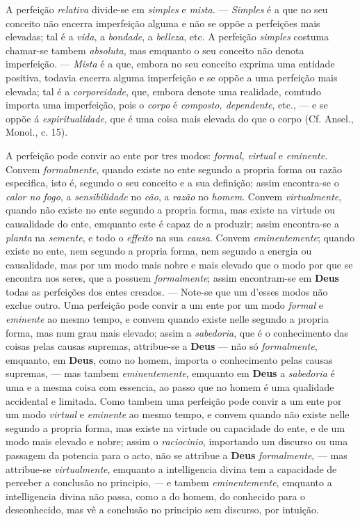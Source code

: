 {A perfeição \emph{relativa} divide-se em \emph{simples} e \emph{mista}. ---
\emph{Simples} é a que no seu conceito não encerra imperfeição alguma e não se oppõe a
perfeições mais elevadas; tal é a \emph{vida}, a \emph{bondade}, a \emph{belleza}, etc. A
perfeição \emph{simples} costuma chamar-se tambem \emph{absoluta}, mas emquanto o seu
conceito não denota imperfeição. --- \emph{Mista} é a que, embora no seu conceito exprima
uma entidade positiva, todavia encerra alguma imperfeição e se oppõe a uma perfeição mais
elevada; tal é a \emph{corporeidade}, que, embora denote uma realidade, comtudo importa
uma imperfeição, pois o \emph{corpo} é \emph{composto, dependente}, etc., --- e se oppõe
á \emph{espiritualidade}, que é uma coisa mais elevada do que o corpo (Cf. Ansel., Monol.,
c. 15).

A perfeição pode convir ao ente por tres modos: \emph{formal, virtual} e
\emph{eminente}. Convem \emph{formalmente}, quando existe no ente segundo a propria forma
ou razão especifica, isto é, segundo o seu conceito e a sua definição; assim encontra-se
o \emph{calor no fogo}, a \emph{sensibilidade} no \emph{cão}, a \emph{razão} no
\emph{homem}. Convem \emph{virtualmente}, quando não existe no ente segundo a propria
forma, mas existe na virtude ou causalidade do ente, emquanto este é capaz de a produzir;
assim encontra-se a \emph{planta} na \emph{semente}, e todo o \emph{effeito} na sua
\emph{causa}. Convem \emph{eminentemente}; quando existe no ente, nem segundo a propria
forma, nem segundo a energia ou causalidade, mas por um modo mais nobre e mais elevado
que o modo por que se encontra nos seres, que a possuem \emph{formalmente}; assim
encontram-se em \textbf{Deus} todas as perfeições dos entes creados. --- Note-se que um
d'esses modos não exclue outro. Uma perfeição pode convir a um ente por um modo
\emph{formal} e \emph{eminente} ao mesmo tempo, e convem quando existe nelle segundo a
propria forma, mas num grau mais elevado; assim a \emph{sabedoria}, que é o conhecimento
das coisas pelas causas supremas, attribue-se a \textbf{Deus} --- não só
\emph{formalmente}, emquanto, em \textbf{Deus}, como no homem, importa o conhecimento
pelas causas supremas, --- mas tambem \emph{eminentemente}, emquanto em \textbf{Deus} a
\emph{sabedoria} é uma e a mesma coisa com essencia, ao passo que no homem é uma
qualidade accidental e limitada. Como tambem uma perfeição pode convir a um ente por um
modo \emph{virtual} e \emph{eminente} ao mesmo tempo, e convem quando não existe nelle
segundo a propria forma, mas existe na virtude ou capacidade do ente, e de um modo mais
elevado e nobre; assim o \emph{raciocinio}, importando um discurso ou uma passagem da
potencia para o acto, não se attribue a \textbf{Deus} \emph{formalmente}, --- mas
attribue-se \emph{virtualmente}, emquanto a intelligencia divina tem a capacidade de
perceber a conclusão no principio, --- e tambem \emph{eminentemente}, emquanto a
intelligencia divina não passa, como a do homem, do conhecido para o desconhecido, mas
vê a conclusão no principio sem discurso, por intuição.

}
